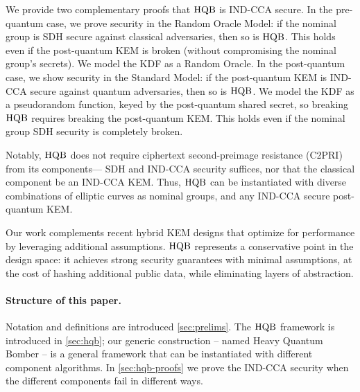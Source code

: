 We provide two complementary proofs that $\text{HQB}$ is IND-CCA secure. In the
pre-quantum case, we prove security in the Random Oracle Model: if the
nominal group is SDH secure against classical adversaries, then so is
$\text{HQB}$. This holds even if the post-quantum KEM is broken (without
compromising the nominal group's secrets). We model the KDF as a Random
Oracle. In the post-quantum case, we show security in the Standard Model: if
the post-quantum KEM is IND-CCA secure against quantum adversaries, then so
is $\text{HQB}$. We model the KDF as a pseudorandom function, keyed by the
post-quantum shared secret, so breaking $\text{HQB}$ requires breaking the
post-quantum KEM. This holds even if the nominal group SDH security is
completely broken.

Notably, $\text{HQB}$ does not require ciphertext second-preimage resistance
(C2PRI)\cite{CiC:BCDKSV24} from its components— SDH and IND-CCA security
suffices, nor that the classical component be an IND-CCA KEM. Thus, $\text{HQB}$
can be instantiated with diverse combinations of elliptic curves as nominal
groups, and any IND-CCA secure post-quantum KEM.

Our work complements recent hybrid KEM designs that optimize for performance
by leveraging additional assumptions. $\text{HQB}$ represents a conservative point in
the design space: it achieves strong security guarantees with minimal
assumptions, at the cost of hashing additional public data, while eliminating
layers of abstraction.

\paragraph{Structure of this paper.}
Notation and definitions are introduced \autoref{sec:prelims}.  The $\text{HQB}$
framework is introduced in \autoref{sec:hqb}; our generic construction --
named Heavy Quantum Bomber -- is a general framework that can be instantiated
with different component algorithms.  In \autoref{sec:hqb-proofs} we prove
the IND-CCA security when the different components fail in different ways.
